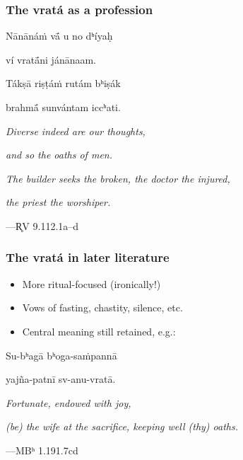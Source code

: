 \documentclass[pdf]{beamer}
\begin{document}
\begin{frame} \frametitle{The vratá as a profession}
\begin{center}
	Nānānáṁ vā́ u no dʰíyaḥ

	ví vratā́ni jánānaam.

	Tákṣā riṣṭáṁ rutám bʰiṣák

	brahmā́ sunvántam iccʰati.

	\vspace{12pt}

	\textit{Diverse indeed are our thoughts,}

	\textit{and so the oaths of men.}

	\textit{The builder seeks the broken, the doctor the injured,}

	\textit{the priest the worshiper.}

	\vspace{12pt}

 	---R̥V 9.112.1a--d
\end{center}
\end{frame}

\begin{frame} \frametitle{The vratá in later literature}
\begin{itemize}
	\item More ritual-focused (ironically!)
	\item Vows of fasting, chastity, silence, etc.
	\item Central meaning still retained, e.g.:
\end{itemize}
\begin{center}
	Su-bʰagā bʰoga-saṁpannā

	yajña-patnī sv-anu-vratā.

	\vspace{12pt}

	\textit{Fortunate, endowed with joy,}

	\textit{(be) the wife at the sacrifice, keeping well (thy) oaths.}

	\vspace{12pt}

 	---MBʰ 1.191.7cd
\end{center}
\end{frame}

\end{document}
